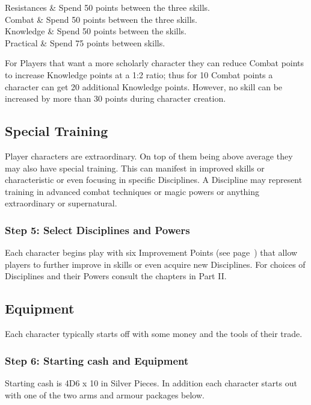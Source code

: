 \begin{rpg-table}[|l|X|]
	\hline
	Resistances   & Spend 50 points between the three skills.\\
	Combat        & Spend 50 points between the three skills.\\
	Knowledge     & Spend 50 points between the skills.\\
	Practical     & Spend 75 points between skills.\\
	\hline
\end{rpg-table}

For Players that want a more scholarly character they can reduce Combat points to increase Knowledge points at a 1:2 ratio; thus for 10 Combat points a character can get 20 additional Knowledge points. However, no skill can be increased by more than 30 points during character creation.


\subsection{Special Training}
Player characters are extraordinary. On top of them being above average they may also have special training. This can manifest in improved skills or characteristic or even focusing in specific Disciplines. A Discipline may represent training in advanced combat techniques or magic powers or anything extraordinary or supernatural.


\subsubsection{Step 5: Select Disciplines and Powers}
Each character begins play with six Improvement Points (see page~\pageref{ssec:improvement-points}) that allow players to further improve in skills or even acquire new Disciplines. For choices of Disciplines and their Powers consult the chapters in Part II.

\subsection{Equipment}
Each character typically starts off with some money and the tools of their trade.

\subsubsection{Step 6: Starting cash and Equipment}
Starting cash is 4D6 x 10 in Silver Pieces. In addition each character starts out with one of the two arms and armour packages below.

